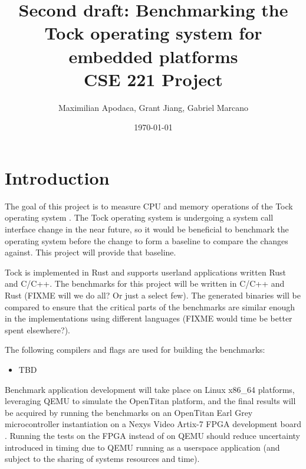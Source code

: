 \documentclass{article}
\title{Second draft: Benchmarking the Tock operating system for embedded platforms \\[0.2em]\smaller{} CSE 221 Project}
\author{Maximilian Apodaca, Grant Jiang, Gabriel Marcano}
\date{\today}
\begin{document}
\maketitle

\section{Introduction}

The goal of this project is to measure CPU and memory operations of the Tock operating system \cite{levy17multiprogramming}. The Tock operating system is undergoing a system call interface change in the near future, so it would be beneficial to benchmark the operating system before the change to form a baseline to compare the changes against. This project will provide that baseline. %

Tock is implemented in Rust and supports userland applications written Rust and C/C++. The benchmarks for this project will be written in C/C++ and Rust (FIXME will we do all? Or just a select few). The generated binaries will be compared to ensure that the critical parts of the benchmarks are similar enough in the implementations using different languages (FIXME would time be better spent elsewhere?). %

The following compilers and flags are used for building the benchmarks:
\begin{itemize}
    \item TBD
\end{itemize}

Benchmark application development will take place on Linux x86\_64 platforms, leveraging QEMU to simulate the OpenTitan platform, and the final results will be acquired by running the benchmarks on an OpenTitan Earl Grey microcontroller instantiation on a Nexys Video Artix-7 FPGA development board \cite{opentitangithub}. Running the tests on the FPGA instead of on QEMU should reduce uncertainty introduced in timing due to QEMU running as a userspace application (and subject to the sharing of systems resources and time). %
\end{document}
